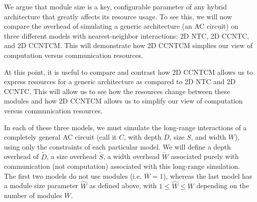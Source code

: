 We argue that module size is a key, configurable parameter of any
hybrid architecture that greatly affects its resource usage. To see this,
we will now compare the overhead of simulating a generic architecture
(an \textsf{AC} circuit) on three different models with nearest-neighbor
interactions: \textsf{2D NTC}, \textsf{2D CCNTC}, and \textsf{2D CCNTCM}.
This will demonstrate how \textsf{2D CCNTCM} simplies our view of computation
versus communication resources.





At this point, it is useful to compare and contrast how \textsf{2D CCNTCM}
allows us to express resources for a generic architecture as compared to
\textsf{2D NTC} and \textsf{2D CCNTC}. This will allow us to see how
the resources change between these modules and how \textsf{2D CCNTCM}
allows us to simplify our view of computation versus communication
resources.

In each of these three models, we must simulate the long-range
interactions of a completely general \textsf{AC} circuit (call it $C$, with
depth $D$, size $S$, and width $W$), using only the
constraints of each particular model. We will define a depth overhead
of $\tilde{D}$, a size overhead $\tilde{S}$, a width overhead $\tilde{W}$
associated purely with communication (not computation) associated with
this long-range simulation. The first two models do not use modules
(i.e. $\overline{W} = 1$),
whereas the last model has a module size parameter $\hat{W}$ as defined above, with $1 \le \hat{W} \le W$ depending on the number of modules
$\overline{W}$.

